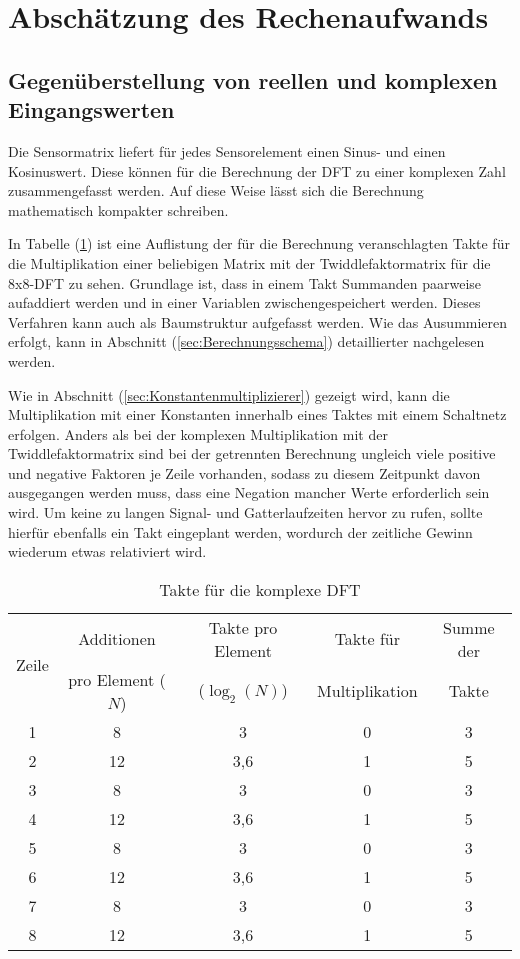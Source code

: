 \section{Abschätzung des Rechenaufwands}\label{sec:abschaetzung_Rechenaufwand}

\subsection{Gegenüberstellung von reellen und komplexen Eingangswerten}\label{sec:GegenüberstellungRelleKomplexeEingangswerte}
Die Sensormatrix liefert für jedes Sensorelement einen Sinus- und einen Kosinuswert. Diese können für die Berechnung der DFT zu einer komplexen Zahl zusammengefasst werden. 
Auf diese Weise lässt sich die Berechnung mathematisch kompakter schreiben.


In Tabelle (\ref{tab:TakteKomplexeDFT}) ist eine Auflistung der für die Berechnung veranschlagten Takte für die Multiplikation einer beliebigen Matrix mit der
Twiddlefaktormatrix für die 8x8-DFT zu sehen. Grundlage ist, dass in einem Takt Summanden 
paarweise aufaddiert werden und in einer Variablen zwischengespeichert werden. Dieses Verfahren kann auch als Baumstruktur aufgefasst werden. 
Wie das Ausummieren erfolgt, kann in Abschnitt (\ref{sec:Berechnungsschema}) detaillierter nachgelesen werden.

Wie in Abschnitt (\ref{sec:Konstantenmultiplizierer}) gezeigt wird, kann die Multiplikation mit einer Konstanten innerhalb eines Taktes mit einem Schaltnetz erfolgen. 
Anders als bei der komplexen Multiplikation mit der Twiddlefaktormatrix sind bei der getrennten Berechnung ungleich viele positive und negative Faktoren je Zeile vorhanden, 
sodass zu diesem Zeitpunkt davon ausgegangen werden muss, dass eine Negation mancher Werte erforderlich sein wird. Um keine zu langen Signal- und Gatterlaufzeiten hervor zu 
rufen, sollte hierfür ebenfalls ein Takt eingeplant werden, wordurch der zeitliche Gewinn wiederum etwas relativiert wird.


\begin{table}[htbp]
\centering
\caption{Takte für die komplexe DFT}
\label{tab:TakteKomplexeDFT}
\begin{tabular}{ccccc}
\hline
\multirow{2}{*}{Zeile} & Additionen & Takte pro Element & Takte für & Summe der\\
      & pro Element ($N$) & ($\log_2(N)$) & Multiplikation & Takte\\
\hline
 1& 8  & 3   &0 &3\\
 2& 12 & 3,6 &1 &5\\
 3& 8  & 3   &0 &3\\
 4& 12 & 3,6 &1 &5\\
 5& 8  & 3   &0 &3\\
 6& 12 & 3,6 &1 &5\\
 7& 8  & 3   &0 &3\\
 8& 12 & 3,6 &1 &5\\
\hline
\end{tabular}
\end{table}

